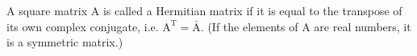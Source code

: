 A square matrix A is called a Hermitian matrix if it is equal to the transpose 
of its own complex conjugate, i.e. 
$ \mathrm{A}^{\mathrm{T}} = \bar{\mathrm{A}} . $
(If the elements of A are real numbers, it is a symmetric matrix.)